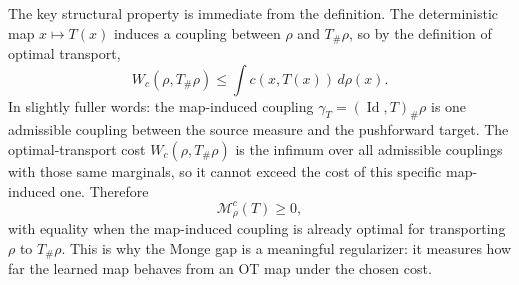 The key structural property is immediate from the definition.  The deterministic
map \(x\mapsto T(x)\) induces a coupling between \(\rho\) and \(T_\#\rho\), so by
the definition of optimal transport,
\begin{equation}
\label{eq:bf-neural-ot-direct-monge-gap-nonnegative}
  W_c(\rho,T_\#\rho)
  \le
  \int c(x,T(x))\,d\rho(x).
\end{equation}
In slightly fuller words: the map-induced coupling
\(\gamma_T=(\operatorname{Id},T)_\#\rho\) is one admissible coupling between the
source measure and the pushforward target.  The optimal-transport cost
\(W_c(\rho,T_\#\rho)\) is the infimum over all admissible couplings with those
same marginals, so it cannot exceed the cost of this specific map-induced one.
Therefore
\begin{equation}
\label{eq:bf-neural-ot-direct-monge-gap-nonnegative-conclusion}
  \mathcal M_\rho^c(T)\ge 0,
\end{equation}
with equality when the map-induced coupling is already optimal for transporting
\(\rho\) to \(T_\#\rho\).  This is why the Monge gap is a meaningful regularizer:
it measures how far the learned map behaves from an OT map under the chosen cost.

